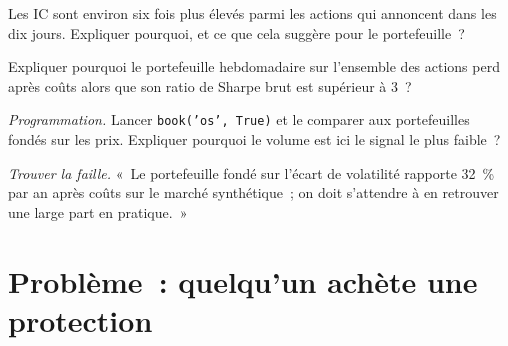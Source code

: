\begin{exercise}[$\star\star$]\label{exo:s1:options-implied-signals-for-stocks:5}
Les IC sont environ six fois plus élevés parmi les actions qui annoncent dans les dix jours. Expliquer pourquoi, et ce que cela suggère pour le portefeuille~?
\end{exercise}

\begin{exercise}[$\star\star$]\label{exo:s1:options-implied-signals-for-stocks:6}
Expliquer pourquoi le portefeuille hebdomadaire sur l'ensemble des actions perd après coûts alors que son ratio de Sharpe brut est supérieur à 3~?
\end{exercise}

\begin{exercise}[$\star\star\star$]\label{exo:s1:options-implied-signals-for-stocks:7}
\emph{Programmation.} Lancer \texttt{book('os', True)} et le comparer aux portefeuilles fondés sur les prix. Expliquer pourquoi le volume est ici le signal le plus faible~?
\end{exercise}

\begin{exercise}[$\star\star\star$]\label{exo:s1:options-implied-signals-for-stocks:8}
\emph{Trouver la faille.} «~Le portefeuille fondé sur l'écart de volatilité rapporte 32~\% par an après coûts sur le marché synthétique~; on doit s'attendre à en retrouver une large part en pratique.~»
\end{exercise}

\section{Problème~: quelqu'un achète une protection}

